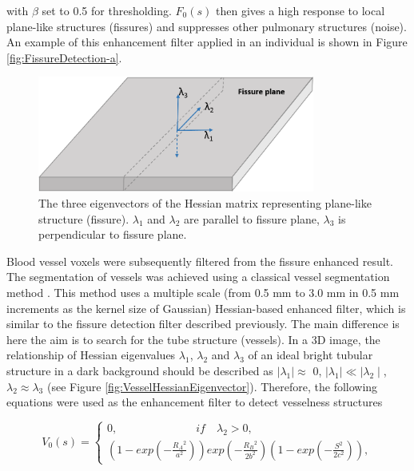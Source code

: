 {\noindent with $\beta$ set to 0.5 for thresholding. $F_0(s)$ then gives a high response to local plane-like structures (fissures) and suppresses other pulmonary structures (noise). An example of this enhancement filter applied in an individual is shown in Figure \ref{fig:FissureDetection-a}. 

\begin{figure}[htbp]
  \centering 
	\vspace{.15in} %
  \includegraphics[height=1.5in]{Segmentation/Image/FissureHessianEigenvector.png}
  \caption{The three eigenvectors of the Hessian matrix representing plane-like structure (fissure). $\lambda_1$ and $\lambda_2$ are parallel to fissure plane, $\lambda_3$ is perpendicular to fissure plane.}
  \label{fig:FissureHessianEigenvector}
\end{figure}

Blood vessel voxels were subsequently filtered from the fissure enhanced result. The segmentation of vessels was achieved using a classical vessel segmentation method \citep{frangi1998multiscale}. This method uses a multiple scale (from 0.5 mm to 3.0 mm in 0.5 mm increments as the kernel size of Gaussian) Hessian-based enhanced filter, which is similar to the fissure detection filter described previously. The main difference is here the aim is to search for the tube structure (vessels). In a 3D image,  the relationship of Hessian eigenvalues $\lambda_{1}$, $\lambda_{2}$ and $\lambda_{3}$ of an ideal bright tubular structure in a dark background should be described as $\mid\lambda_{1}\mid\approx$ 0, $\mid\lambda_{1}\mid\ll\mid\lambda_{2}\mid$,  $\lambda_{2}\approx\lambda_{3}$ (see Figure \ref{fig:VesselHessianEigenvector}). Therefore, the following equations were used as the enhancement filter to detect vesselness structures

\begin{equation}
\label{eq:VesselHessian1}
V_0(s) = \begin{cases}
         0,\quad\quad\quad\quad\quad\quad\quad if \quad \lambda_{2}>0,\\
         (1-exp(-\frac{{R_A}^2}{a^2}))exp(-\frac{{R_B}^2}{2b^2})(1-exp(-\frac{S^2}{2c^2})),
         \end{cases}
\end{equation}

}
